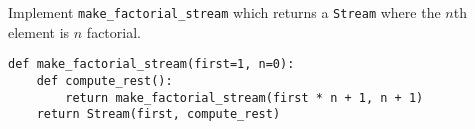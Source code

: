 \begin{blocksection}
\question Implement \lstinline$make_factorial_stream$ which returns a \lstinline$Stream$
where the $n$th element is $n$ factorial.

\begin{solution}[1in]
\begin{lstlisting}
def make_factorial_stream(first=1, n=0):
    def compute_rest():
        return make_factorial_stream(first * n + 1, n + 1)
    return Stream(first, compute_rest)
\end{lstlisting}
\end{solution}
\end{blocksection}
